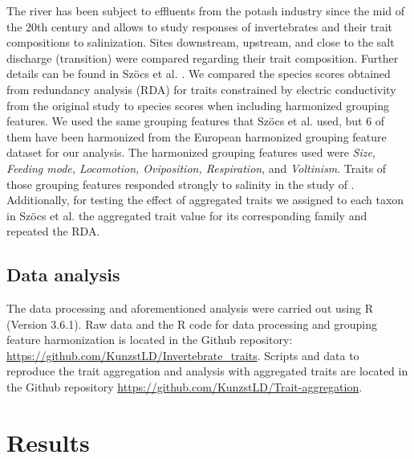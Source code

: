 \documentclass{article}
\begin{document}
The river has been subject to effluents from the potash industry since the mid of the 20th century and allows to study responses of invertebrates and their trait compositions to salinization. Sites downstream, upstream, and close to the salt discharge (transition) were compared regarding their trait composition. Further details can be found in Szöcs et al. \cite{szocs_effects_2014}. We compared the species scores obtained from redundancy analysis (RDA) for traits constrained by electric conductivity from the original study to species scores when including harmonized grouping features. We used the same grouping features that Szöcs et al. \cite{szocs_effects_2014} used, but 6 of them have been harmonized from the European harmonized grouping feature dataset for our analysis. The harmonized grouping features used were \textit{Size, Feeding mode, Locomotion, Oviposition, Respiration}, and \textit{Voltinism}. Traits of those grouping features responded strongly to salinity in the study of \cite{szocs_effects_2014}. Additionally, for testing the effect of aggregated traits we assigned to each taxon in Szöcs et al. \cite{szocs_effects_2014} the aggregated trait value for its corresponding family and repeated the RDA.  


\subsection*{Data analysis}

The data processing and aforementioned analysis were carried out using R (Version 3.6.1). Raw data and the R code for data processing and grouping feature harmonization is located in the Github repository: \url{https://github.com/KunzstLD/Invertebrate_traits}. Scripts and data to reproduce the trait aggregation and analysis with aggregated traits are located in the Github repository \url{https://github.com/KunzstLD/Trait-aggregation}.


\newpage
\section*{Results}
\end{document}

